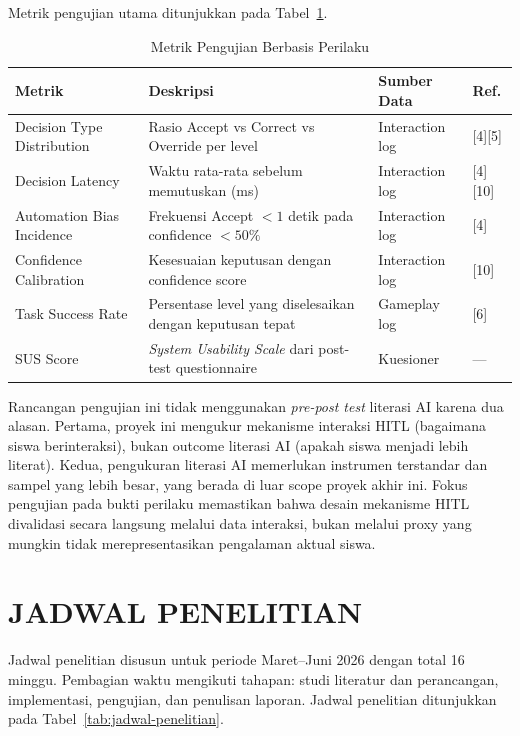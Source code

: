 \documentclass[10pt,twoside,openright]{report}
\begin{document}
Metrik pengujian utama ditunjukkan pada Tabel~\ref{tab:metrik-pengujian}.

\begin{table}[H]
\centering
\caption{Metrik Pengujian Berbasis Perilaku}
\label{tab:metrik-pengujian}
\begin{tabular}{|p{3.5cm}|p{4cm}|p{3cm}|p{2cm}|}
\hline
\textbf{Metrik} & \textbf{Deskripsi} & \textbf{Sumber Data} & \textbf{Ref.} \\ \hline
Decision Type Distribution & Rasio Accept vs Correct vs Override per level & Interaction log & [4][5] \\ \hline
Decision Latency & Waktu rata-rata sebelum memutuskan (ms) & Interaction log & [4][10] \\ \hline
Automation Bias Incidence & Frekuensi Accept $< 1$ detik pada confidence $< 50\%$ & Interaction log & [4] \\ \hline
Confidence Calibration & Kesesuaian keputusan dengan confidence score & Interaction log & [10] \\ \hline
Task Success Rate & Persentase level yang diselesaikan dengan keputusan tepat & Gameplay log & [6] \\ \hline
SUS Score & \textit{System Usability Scale} dari post-test questionnaire & Kuesioner & --- \\ \hline
\end{tabular}
\end{table}

Rancangan pengujian ini tidak menggunakan \textit{pre-post test} literasi AI karena dua alasan. Pertama, proyek ini mengukur mekanisme interaksi HITL (bagaimana siswa berinteraksi), bukan outcome literasi AI (apakah siswa menjadi lebih literat). Kedua, pengukuran literasi AI memerlukan instrumen terstandar dan sampel yang lebih besar, yang berada di luar scope proyek akhir ini. Fokus pengujian pada bukti perilaku memastikan bahwa desain mekanisme HITL divalidasi secara langsung melalui data interaksi, bukan melalui proxy yang mungkin tidak merepresentasikan pengalaman aktual siswa.


\section{JADWAL PENELITIAN}
\label{sec:jadwal-penelitian}

Jadwal penelitian disusun untuk periode Maret--Juni 2026 dengan total 16 minggu. Pembagian waktu mengikuti tahapan: studi literatur dan perancangan, implementasi, pengujian, dan penulisan laporan. Jadwal penelitian ditunjukkan pada Tabel~\ref{tab:jadwal-penelitian}.
\end{document}
